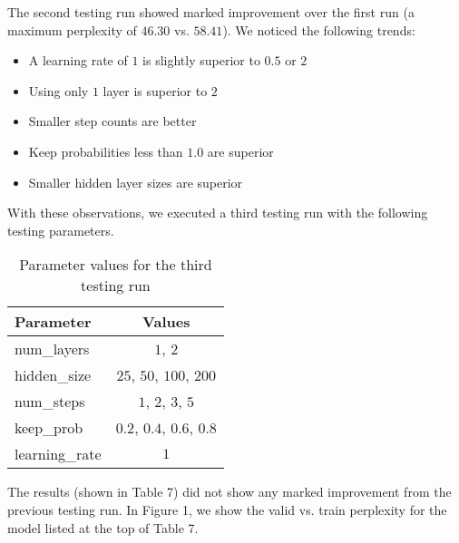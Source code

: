 \documentclass[a4paper]{article}
\begin{document}
The second testing run showed marked improvement over the first run
(a maximum perplexity of $46.30$ vs. $58.41$).
We noticed the following trends:

\vspace{0.1in}
\begin{addmargin}[0.5in]{0in}
    \begin{itemize}
    \setlength\itemsep{-0.3em}
        \item A learning rate of $1$ is slightly superior to $0.5$ or $2$
        \item Using only $1$ layer is superior to $2$
        \item Smaller step counts are better
        \item Keep probabilities less than $1.0$ are superior
        \item Smaller hidden layer sizes are superior
    \end{itemize}
\end{addmargin}
\vspace{0.1in}

With these observations, we executed a third testing run with the following
testing parameters.


\begin{table}[h]
 \caption{Parameter values for the third testing run}
 \label{table}
 \begin{center}
  \begin{tabular}{l|c}
    \hline \hline
    Parameter & Values \\
    \hline
        num\_layers & $1$, $2$ \\
        hidden\_size & $25$, $50$, $100$, $200$ \\
        num\_steps & $1$, $2$, $3$, $5$ \\
        keep\_prob & $0.2$, $0.4$, $0.6$, $0.8$ \\
        learning\_rate & $1$ \\
    \hline
  \end{tabular}
 \end{center}
\end{table}

The results (shown in Table 7) did not show any marked improvement from the
previous testing run. In Figure 1, we show the valid vs. train perplexity for
the model listed at the top of Table 7.
\end{document}
